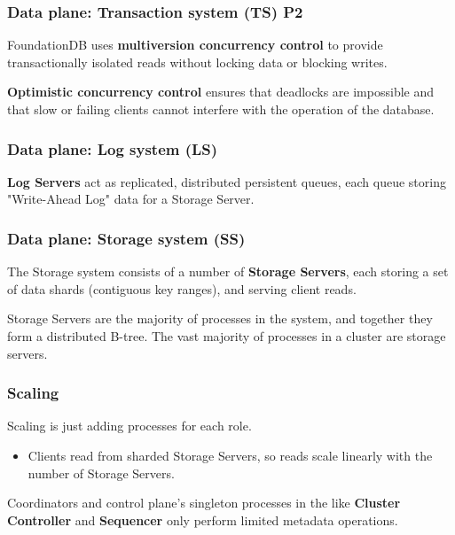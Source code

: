 \begin{frame}
	\frametitle{Data plane: Transaction system (TS) P2}

FoundationDB uses \textbf{multiversion concurrency control} to provide transactionally isolated reads without locking data or blocking writes.
\vspace{0.5cm}

\textbf{Optimistic concurrency control} ensures that deadlocks are impossible and that slow or failing clients cannot interfere with the operation of the database.
	
\end{frame}



\begin{frame}
	\frametitle{Data plane: Log system (LS)}

\textbf{Log Servers} act as replicated, distributed persistent queues, each queue storing "Write-Ahead Log" data for a Storage Server.
	
\end{frame}



\begin{frame}
	\frametitle{Data plane: Storage system (SS)}
The Storage system consists of a number of \textbf{Storage Servers}, each
storing a set of data shards (contiguous key ranges),
and serving client reads. 
\vspace{0.5cm}

Storage Servers are the majority of processes in the system, and together they form a distributed B-tree.
The vast majority of processes in a cluster are storage servers.
	
\end{frame}

\begin{frame}
	\frametitle{Scaling}
Scaling is just adding processes for each role. \\

\begin{itemize}
\item Clients read from sharded Storage Servers, so reads scale
linearly with the number of Storage Servers. 
\end{itemize}

\vspace{0.5cm}
Coordinators and control plane's singleton processes in the  like \textbf{Cluster Controller} and \textbf{Sequencer} only perform limited metadata operations.
	
\end{frame}

